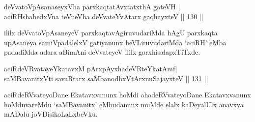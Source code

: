 
\begin{shl}
deVvatoVpAsanaseyxVha parxkaqtatAvxtatxthA gateVH | \\
aciRHshabedxVna teVneVha deVvateYvAtarx gaqhayxteV \hfill|| 130 || 
\end{shl}

\begin{artha}
ililx deVvatoVpAsaneyeV parxkaqtavAgiruvudariMda hAgU parxkaqta
upA\-saneya samiVpadalelxV gatiyanunx heVLiruvudariMda `aciRH' eMba
padadiMda adara aBimAni deVvateyeV ililx garxhisalapxTiTxde. 
\end{artha}

\begin{shl}
aciRdeVRvatayeYkatavxM pArxpAyxhadeVRteYkatAmf\footnotemark[1] | \\
saMBavanitxVti savaRtarx saMbanodhxV\s tArxnuSajayxteV \hfill|| 131 || 
\end{shl}

\begin{artha}
aciRdeRVvateyoDane Ekatavxvanunx hoMdi ahadeRVvateyoDane Ekatavxvanunx
hoMduvareMdu `saMBavanitx' eMbudanunx muMde elalx kaDeyalUlx anavxya
mADalu joVDisikoLaLxbeVku.
\end{artha}


